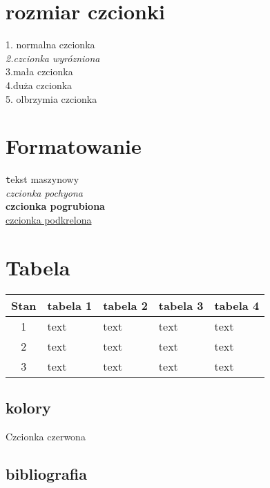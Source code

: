 \documentclass[a4paper]{article}
\begin{document}
\begin{table}
\begin{center}

\section{rozmiar czcionki}
1. normalna czcionka \\ 
\emph{2.czcionka wyrózniona }\\
{\small 3.mała czcionka } \\
{\large 4.duża czcionka } \\
{\Huge 5. olbrzymia czcionka}\\

\section{Formatowanie}
{\texttt tekst maszynowy } \\
\textsl{czcionka pochyona}\\
\textbf{czcionka pogrubiona}\\
\underline{czcionka podkrelona}\\
\section{Tabela}




\begin{tabular}{|c||l|l|l|l|}
\hline Stan & tabela 1 & tabela 2 & tabela 3 & tabela 4 \\ \hline \hline
1 & text & text & text & text \\
2 & text & text & text & text \\
3 & text & text & text & text \\ \hline
\end{tabular}
\end{center}
\end{table}

\begin{center}

\section {kolory}
{\color{red} Czcionka czerwona}\\

\subsection{bibliografia}



\end{center}
\end{document}
